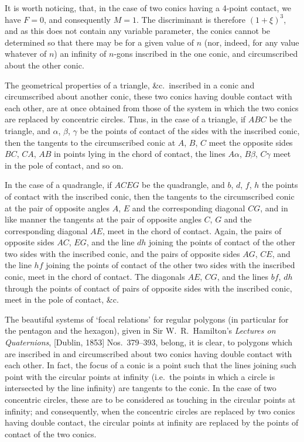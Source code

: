 \documentclass[11pt,a4paper]{article}
\begin{document}
It is worth noticing, that, in the case of two conics having a 4-point contact, we have $F = 0$, and consequently $M = 1$. The discriminant is therefore $(1 + \xi)^3$, and as this does not contain any variable parameter, the conics cannot be determined so that there may be for a given value of $n$ (nor, indeed, for any value whatever of $n$) an infinity of $n$-gons inscribed in the one conic, and circumscribed about the other conic.

\medskip

The geometrical properties of a triangle, \&c.\ inscribed in a conic and circumscribed about another conic, these two conics having double contact with each other, are at once obtained from those of the system in which the two conics are replaced by concentric circles. Thus, in the case of a triangle, if $ABC$ be the triangle, and $\alpha$, $\beta$, $\gamma$ be the points of contact of the sides with the inscribed conic, then the tangents to the circumscribed conic at $A$, $B$, $C$ meet the opposite sides $BC$, $CA$, $AB$ in points lying in the chord of contact, the lines $A\alpha$, $B\beta$, $C\gamma$ meet in the pole of contact, and so on.

\medskip

In the case of a quadrangle, if $ACEG$ be the quadrangle, and $b$, $d$, $f$, $h$ the points of contact with the inscribed conic, then the tangents to the circumscribed conic at the pair of opposite angles $A$, $E$ and the corresponding diagonal $CG$, and in like manner the tangents at the pair of opposite angles $C$, $G$ and the corresponding diagonal $AE$, meet in the chord of contact. Again, the pairs of opposite sides $AC$, $EG$, and the line $dh$ joining the points of contact of the other two sides with the inscribed conic, and the pairs of opposite sides $AG$, $CE$, and the line $hf$ joining the points of contact of the other two sides with the inscribed conic, meet in the chord of contact. The diagonals $AE$, $CG$, and the lines $bf$, $dh$ through the points of contact of pairs of opposite sides with the inscribed conic, meet in the pole of contact, \&c.

\medskip

The beautiful systems of `focal relations' for regular polygons (in particular for the pentagon and the hexagon), given in Sir W.\ R.\ Hamilton's \textit{Lectures on Quaternions}, [Dublin, 1853] Nos.\ 379--393, belong, it is clear, to polygons which are inscribed in and circumscribed about two conics having double contact with each other. In fact, the focus of a conic is a point such that the lines joining such point with the circular points at infinity (i.e.\ the points in which a circle is intersected by the line infinity) are tangents to the conic. In the case of two concentric circles, these are to be considered as touching in the circular points at infinity; and consequently, when the concentric circles are replaced by two conics having double contact, the circular points at infinity are replaced by the points of contact of the two conics.
\end{document}

